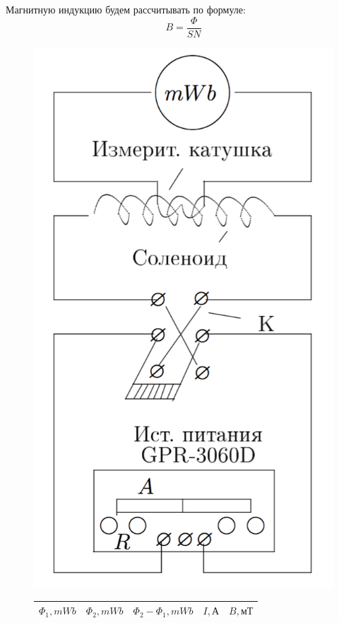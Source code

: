 \documentclass[a4paper, 12pt]{article}
\begin{document}
Магнитную индукцию будем рассчитывать по формуле:
$$B = \dfrac{\Phi}{SN}$$
\begin{figure}[H]
\parbox[H]{0.3\textwidth}{\null
  \centering
  \includegraphics[width = \linewidth]{focus}
  }
\parbox[H]{0.65 \textwidth}{\null
\centering
  \begin{tabular}{|c|c|c|c|c|}
\hline
$\Phi_1, mWb$  & $\Phi_2, mWb$  & $\Phi_2 - \Phi_1, mWb$  & $I, \text{А}$   & $B, \text{мТ}$   \\ \hline

\end{tabular}}
\end{figure}
\end{document}
